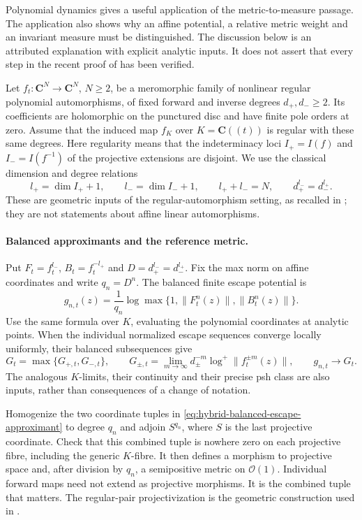 Polynomial dynamics gives a useful application of the metric-to-measure
passage. The application also shows why an affine potential, a relative
metric weight and an invariant measure must be distinguished. The
discussion below is an attributed explanation with explicit analytic
inputs. It does not assert that every step in the recent proof of
\cite{Irokawa26RegularV1} has been verified.

Let $f_t:\mathbf C^N\to\mathbf C^N$, $N\geq2$, be a meromorphic
family of nonlinear regular polynomial automorphisms, of fixed forward
and inverse degrees $d_+,d_-\geq2$. Its coefficients are holomorphic
on the punctured disc and have finite pole orders at zero. Assume that
the induced map $f_K$ over $K=\mathbf C((t))$ is regular with these
same degrees. Here regularity means that the indeterminacy loci
$I_+=I(f)$ and $I_-=I(f^{-1})$ of the projective extensions are
disjoint. We use the classical dimension and degree relations
\[
 l_+=\dim I_++1,\qquad l_-=\dim I_-+1,
 \qquad l_++l_-=N,\qquad d_+^{l_-}=d_-^{l_+}.
\tag{66.29a}\label{eq:hybrid-regular-degree-balance}
\]
These are geometric inputs of the regular-automorphism setting,
as recalled in \cite{Kawaguchi13RegularPublished,Lee12RegularPairV2};
they are not statements about affine linear automorphisms.

\paragraph{Balanced approximants and the reference metric.}
Put $F_t=f_t^{l_-}$, $B_t=f_t^{-l_+}$ and
$D=d_+^{l_-}=d_-^{l_+}$. Fix the max norm on affine coordinates and
write $q_n=D^n$. The balanced finite escape potential is
\[
 g_{n,t}(z)=\frac{1}{q_n}
  \log\max\{1,\|F_t^n(z)\|,\|B_t^n(z)\|\}.
\tag{66.29b}\label{eq:hybrid-balanced-escape-approximant}
\]
Use the same formula over $K$, evaluating the polynomial coordinates
at analytic points. When the individual normalized escape sequences
converge locally uniformly, their balanced subsequences give
\[
 G_t=\max\{G_{+,t},G_{-,t}\},\qquad
 G_{\pm,t}=\lim_{m\to\infty}
        d_\pm^{-m}\log^+\|f_t^{\pm m}(z)\|,
 \qquad g_{n,t}\longrightarrow G_t.
\tag{66.29c}\label{eq:hybrid-balanced-escape-limit}
\]
The analogous $K$-limits, their continuity and their precise psh class
are also inputs, rather than consequences of a change of notation.

Homogenize the two coordinate tuples in
\eqref{eq:hybrid-balanced-escape-approximant} to degree $q_n$ and
adjoin $S^{q_n}$, where $S$ is the last projective coordinate.
Check that this combined tuple is nowhere zero on each projective
fibre, including the generic $K$-fibre. It then defines a morphism
to projective space and, after division by $q_n$, a semipositive
metric on $\mathcal O(1)$. Individual forward maps need not extend
as projective morphisms. It is the combined tuple that matters.
The regular-pair projectivization is the geometric construction used
in \cite{Lee12RegularPairV2,Irokawa23HenonV2,Irokawa26RegularV1}.

